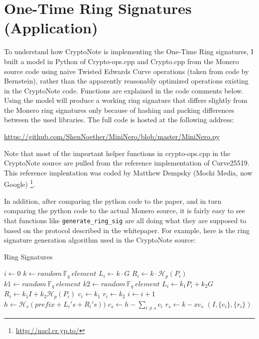 \documentclass[12pt,english]{mrl}
\numberwithin{equation}{section}
\numberwithin{figure}{section}
\begin{document}
\section{One-Time Ring Signatures (Application)}

To understand how CryptoNote is implementing the One-Time Ring signatures,
I built a model in Python of Crypto-ops.cpp and Crypto.cpp from the Monero source
code using naive Twisted Edwards Curve operations (taken
from code by Bernstein), rather than the apparently reasonably optimized
operations existing in the CryptoNote code. Functions
are explained in the code comments below. Using the model will produce
a working ring signature that differs slightly from the Monero ring
signatures only because of hashing and packing differences between
the used libraries. The full code is hosted at the following address: 
\begin{center}
\url{https://github.com/ShenNoether/MiniNero/blob/master/MiniNero.py}
\end{center}
Note that most of the important helper functions in crypto-ops.cpp in the CryptoNote source
are pulled from the reference implementation of Curve25519. This reference
implentation was coded by Matthew Dempsky (Mochi Media, now Google)%
\footnote{\url{http://nacl.cr.yp.to/}%
}. 

In addition, after comparing the python code to the paper, and in
turn comparing the python code to the actual Monero source, it is
fairly easy to see that functions like \texttt{generate\_ring\_sig} are
all doing what they are supposed to based on the protocol described
in the whitepaper. For example, here is the ring signature generation algorithm
used in the CryptoNote source:

\begin{algorithm}[H]
\caption{Ring Signatures}


\begin{algorithmic} 
\State $i\gets 0$
		\State $k \gets random\ \mathbb{F}_q\  element$       
		\State $L_i \gets k \cdot G$
		\State $R_i \gets k\cdot \mathcal{H}_p(P_i)$
	\Else
		\State $k1 \gets random\ \mathbb{F}_q\  element$
		\State $k2 \gets random\ \mathbb{F}_q\  element$
		\State $L_i\gets k_1 P_i + k_2  G$
		\State $R_i\gets k_1 I+k_2 \mathcal{H}_p(P_i)$
		\State $c_i \gets k_1$
		\State $r_i \gets k_2$
	\EndIf 
	\State $i \gets i+1$
\EndWhile
\State $h \gets \mathcal{H}_s(prefix+L_i's+R_i's))$
\State $c_{s} \gets h-\sum_{i\neq s} c_i$
\State $r_s \gets k - x c_s$
\State \Return $(I, \{c_{i}\}, \{r_i\})$
\end{algorithmic} 
\end{algorithm}
\end{document}

